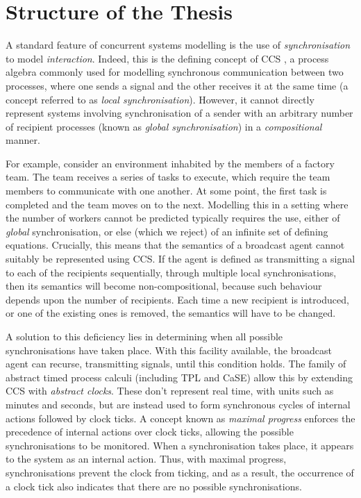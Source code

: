 \section{Structure of the Thesis}

A standard feature of concurrent systems modelling is the use of
\emph{synchronisation} to model \emph{interaction}. Indeed, this is the
defining concept of CCS \cite{milner:ccs}, a process algebra commonly
used for modelling synchronous communication between two processes,
where one sends a signal and the other receives it at the same time (a
concept referred to as \emph{local synchronisation}).  However, it
cannot directly represent systems involving synchronisation of a sender
with an arbitrary number of recipient processes (known as \emph{global
synchronisation}) in a \emph{compositional} manner.  

For example, consider an environment inhabited by the members of a
factory team. The team receives a series of tasks to execute, which
require the team members to communicate with one another. At some point,
the first task is completed and the team moves on to the next. Modelling
this in a setting where the number of workers cannot be predicted
typically requires the use, either of \emph{global} synchronisation, or
else (which we reject) of an infinite set of defining equations.
Crucially, this means that the semantics of a broadcast agent cannot
suitably be represented using CCS.  If the agent is defined as
transmitting a signal to each of the recipients sequentially, through
multiple local synchronisations, then its semantics will become
non-compositional, because such behaviour depends upon the number of
recipients.  Each time a new recipient is introduced, or one of the
existing ones is removed, the semantics will have to be changed.

A solution to this deficiency lies in determining when all possible
synchronisations have taken place.  With this facility available, the
broadcast agent can recurse, transmitting signals, until this
condition holds. The family of abstract timed process calculi
(including TPL\cite{hennessy:tpl} and CaSE\cite{CaSE}) allow this by
extending CCS with \emph{abstract clocks}.  These don't represent real
time, with units such as minutes and seconds, but are instead used to
form synchronous cycles of internal actions followed by clock ticks.
A concept known as \emph{maximal progress} enforces the precedence of
internal actions over clock ticks, allowing the possible
synchronisations to be monitored.  When a synchronisation takes place,
it appears to the system as an internal action.  Thus, with maximal
progress, synchronisations prevent the clock from ticking, and as a
result, the occurrence of a clock tick also indicates that there are
no possible synchronisations.

